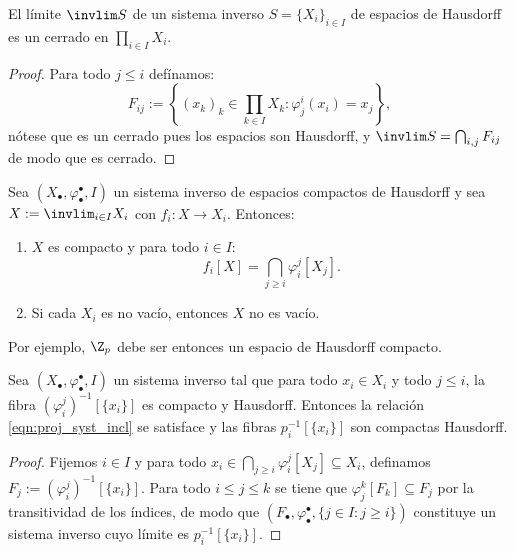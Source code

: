 \documentclass[topologia-analisis.tex]{subfiles}
\begin{document}
\begin{prop}
	El límite $\invlim S$ de un sistema inverso $S = \{ X_i \}_{i\in I}$ de espacios de Hausdorff
	es un cerrado en $\prod_{i\in I} X_i$.
\end{prop}
\begin{proof}
	Para todo $j \le i$ defínamos:
	$$ F_{ij} := \left\{ (x_k)_k \in \prod_{k\in I} X_k : \varphi^i_j(x_i) = x_j \right\}, $$
	nótese que es un cerrado pues los espacios son Hausdorff, y $\invlim S = \bigcap_{i, j} F_{ij}$ de modo que es cerrado.
\end{proof}
\begin{cor}
	Sea $(X_\bullet, \varphi_\bullet^\bullet, I)$ un sistema inverso de espacios compactos de Hausdorff
	y sea $X := \invlim_{i\in I} X_i$ con $f_i \colon X \to X_i$. Entonces:
	\begin{enumerate}
		\item $X$ es compacto y para todo $i \in I$:
			\begin{equation}
				f_i[X] = \bigcap_{j\ge i} \varphi^j_i[X_j].
				\label{eqn:proj_syst_incl}
			\end{equation}
		\item Si cada $X_i$ es no vacío, entonces $X$ no es vacío.
	\end{enumerate}
\end{cor}
Por ejemplo, $\Z_p$ debe ser entonces un espacio de Hausdorff compacto.

\begin{cor}
	Sea $(X_\bullet, \varphi_\bullet^\bullet, I)$ un sistema inverso tal que para todo $x_i \in X_i$ y todo $j \le i$,
	la fibra $(\varphi_i^j)^{-1}[\{ x_i \}]$ es compacto y Hausdorff.
	Entonces la relación \eqref{eqn:proj_syst_incl} se satisface y las fibras $p_i^{-1}[\{ x_i \}]$ son compactas Hausdorff.
\end{cor}
\begin{proof}
	Fijemos $i \in I$ y para todo $x_i \in \bigcap_{j\ge i} \varphi^j_i[X_j] \subseteq X_i$, definamos $F_j := (\varphi_i^j)^{-1}[\{ x_i \}]$.
	Para todo $i \le j \le k$ se tiene que $ \varphi^k_j[F_k] \subseteq F_j$ por la transitividad de los índices,
	de modo que $(F_\bullet, \varphi^\bullet_\bullet, \{ j \in I : j \ge i \})$ constituye un sistema inverso cuyo límite es $p_i^{-1}[\{ x_i \}]$.
\end{proof}
\end{document}
